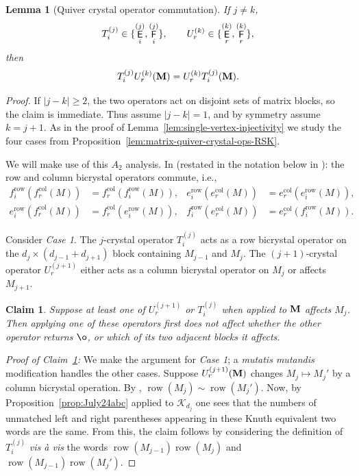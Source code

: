 \documentclass[12pt]{amsart}
\DeclareMathOperator{\mate}{\sf E}
\DeclareMathOperator{\matf}{\sf F}
\newtheorem{lemma}[theorem]{Lemma}
\newtheorem{claim}[theorem]{Claim}
\theoremstyle{definition}
\theoremstyle{remark}
\begin{document}
\begin{lemma}[Quiver crystal operator commutation]\label{lem:quiver-crystal-commute}
If $j\neq k$,
\[T_i^{(j)}\in\{\mate_i^{(j)},\matf_i^{(j)}\},
\qquad
U_r^{(k)}\in\{\mate_r^{(k)},\matf_r^{(k)}\},\]
then
\[T_i^{(j)}U_r^{(k)}({\bf M})=U_r^{(k)}T_i^{(j)}({\bf M}).\]
\end{lemma}
\begin{proof}
If $|j-k|\geq 2$, the two operators act on disjoint sets of matrix
blocks, so the claim is immediate. Thus assume $|j-k|=1$, and by symmetry assume
$k=j+1$. As in the proof of Lemma~\ref{lem:single-vertex-injectivity} we study the four cases
from Proposition~\ref{lem:matrix-quiver-crystal-ops-RSK}.

We will make use of this $A_2$ analysis. In \cite[Lemma~1.4.7]{van}
(restated in the notation below in \cite[Lemma~4.30]{AAA}): the row and column bicrystal operators commute, i.e.,
\[
\begin{aligned}
f_i^{\operatorname{row}}\!\left(f_r^{\operatorname{col}}(M)\right)
&=
f_r^{\operatorname{col}}\!\left(f_i^{\operatorname{row}}(M)\right), &
e_i^{\operatorname{row}}\!\left(e_r^{\operatorname{col}}(M)\right)
&=
e_r^{\operatorname{col}}\!\left(e_i^{\operatorname{row}}(M)\right),\\
e_i^{\operatorname{row}}\!\left(f_r^{\operatorname{col}}(M)\right)
&=
f_r^{\operatorname{col}}\!\left(e_i^{\operatorname{row}}(M)\right), &
f_i^{\operatorname{row}}\!\left(e_r^{\operatorname{col}}(M)\right)
&=
e_r^{\operatorname{col}}\!\left(f_i^{\operatorname{row}}(M)\right).
\end{aligned}
\]


Consider \emph{Case 1}. The $j$-crystal operator $T_i^{(j)}$ acts as a row bicrystal
operator on the $d_{j}\times (d_{j-1}+d_{j+1})$ block containing $M_{j-1}$ and $M_j$. The $(j+1)$-crystal 
operator $U_r^{(j+1)}$ either acts as a column bicrystal operator on $M_j$ or affects $M_{j+1}$. 

\begin{claim}\label{claim:July28zzz}
Suppose at least one of $U_r^{(j+1)}$ or $T_{i}^{(j)}$ when applied to ${\bf M}$ affects $M_j$. Then applying one
of these operators first does not affect whether the other operator returns $\o$, or which of its two adjacent blocks it
affects.
\end{claim}
\noindent\emph{Proof of Claim~\ref{claim:July28zzz}:} We make the argument for  \emph{Case 1}; a \emph{mutatis mutandis}
modification handles the other cases.  Suppose $U_{r}^{(j+1)}({\bf M})$ changes $M_j\mapsto M_j'$ by a column bicrystal operation. 
By \cite[Lemma~4.29]{AAA}, $\operatorname{row}(M_j)\sim \operatorname{row}(M_j')$. 
Now, by Proposition~\ref{prop:July24abc} applied to ${\mathcal K}_{d_j}$ one sees that the 
numbers of unmatched left and right parentheses
appearing in these Knuth equivalent two words are the same. From this, the claim 
follows by considering the definition of $T_i^{(j)}$ \emph{vis \`a vis} the words
${\operatorname{row}}(M_{j-1}) \operatorname{row}(M_j)$ 
and ${\operatorname{row}}(M_{j-1}) \operatorname{row}(M_j')$. 


\end{proof}
\end{document}
